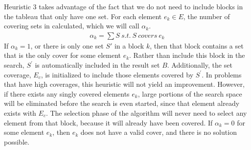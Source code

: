 \documentclass[12pt]{article}
\begin{document}
Heuristic 3 takes advantage of the fact that we do not need to include blocks in the tableau that only have one set. For each element $e_k \in E$, the number of covering sets in calculated, which we will call $\alpha_k$. 
\begin{align*}
\alpha_k = \sum S\:s.t.\:S\:covers\:e_k 
\end{align*}
If $\alpha_k = 1$, or there is only one set $S\prime$ in a block $k$, then that block contains a set that is the only cover for some element $e_k$. Rather than include this block in the search, $S^\prime$ is automatically included in the result set $B$. Additionally, the set coverage, $E_c$, is initialized to include those elements covered by $S^\prime$. In problems that have high coverages, this heuristic will not yield an improvement. However, if there exists any singly covered elements $e_k$, large portions of the search space will be eliminated before the search is even started, since that element already exists with $E_c$. The selection phase of the algorithm will never need to select any element from that block, because it will already have been covered.  If $\alpha_k = 0$ for some element $e_k$, then $e_k$ does not have a valid cover, and there is no solution possible.
\end{document}
